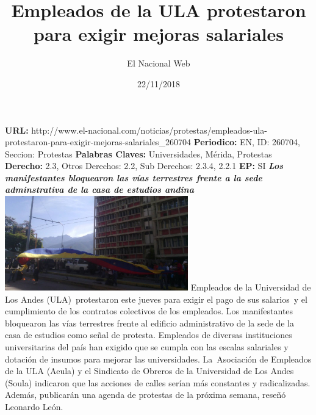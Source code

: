 \documentclass{article}%
\title{\textbf{Empleados de la ULA protestaron para exigir mejoras salariales}}%
\author{El Nacional Web}%
\date{22/11/2018}%
\begin{document}
%
\normalsize%
\maketitle%
\textbf{URL: }%
http://www.el{-}nacional.com/noticias/protestas/empleados{-}ula{-}protestaron{-}para{-}exigir{-}mejoras{-}salariales\_260704\newline%
%
\textbf{Periodico: }%
EN, %
ID: %
260704, %
Seccion: %
Protestas\newline%
%
\textbf{Palabras Claves: }%
Universidades, Mérida, Protestas\newline%
%
\textbf{Derecho: }%
2.3, %
Otros Derechos: %
2.2, %
Sub Derechos: %
2.3.4, 2.2.1\newline%
%
\textbf{EP: }%
SI\newline%
\newline%
%
\textbf{\textit{Los manifestantes bloquearon las vías terrestres frente a la sede adminstrativa de la casa de estudios andina}}%
\newline%
\newline%
%
\includegraphics[width=300px]{74.jpg}%
\newline%
%
Empleados de la Universidad de Los Andes (ULA)~protestaron este jueves para exigir el pago de sus salarios~y el cumplimiento de los contratos colectivos de los empleados.%
\newline%
%
Los manifestantes bloquearon las vías terrestres frente al edificio administrativo de la sede de la casa de estudios como señal de protesta.%
\newline%
%
Empleados de diversas instituciones universitarias del país han exigido que se cumpla con las escalas salariales y dotación de insumos para mejorar las universidades.%
\newline%
%
La~Asociación de Empleados de la ULA (Aeula) y el Sindicato de Obreros de la Universidad de Los Andes (Soula) indicaron que las acciones de calles serían más constantes y radicalizadas. Además, publicarán una agenda de protestas de la próxima semana, reseñó Leonardo León.%
\newline%
%
\end{document}
